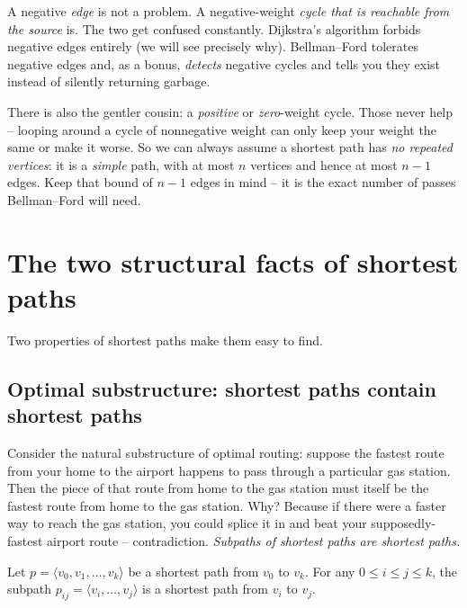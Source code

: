 \begin{trapbox}
A negative \emph{edge} is not a problem. A negative-weight \emph{cycle that is
reachable from the source} is. The two get confused constantly. Dijkstra's
algorithm forbids negative edges entirely (we will see precisely why). Bellman--Ford
tolerates negative edges and, as a bonus, \emph{detects} negative cycles and tells
you they exist instead of silently returning garbage.
\end{trapbox}

There is also the gentler cousin: a \emph{positive} or \emph{zero}-weight cycle.
Those never help -- looping around a cycle of nonnegative weight can only keep
your weight the same or make it worse. So we can always assume a shortest path
has \emph{no repeated vertices}: it is a \emph{simple} path, with at most $n$
vertices and hence at most $n - 1$ edges. Keep that bound of $n-1$ edges in
mind -- it is the exact number of passes Bellman--Ford will need.

\section{The two structural facts of shortest paths}

Two properties of shortest paths make them easy to find.

\subsection{Optimal substructure: shortest paths contain shortest paths}

\begin{intuitionbox}
Consider the natural substructure of optimal routing: suppose the fastest route
from your home to the airport happens to pass through a particular gas station. Then the
piece of that route from home to the gas station must itself be the fastest route
from home to the gas station. Why? Because if there were a faster way to reach the
gas station, you could splice it in and beat your supposedly-fastest airport
route -- contradiction. \emph{Subpaths of shortest paths are shortest paths.}
\end{intuitionbox}

\begin{lemma}\label{ch24:lemma-substructure}
Let $p = \langle v_0, v_1, \dots, v_k\rangle$ be a shortest path from $v_0$ to
$v_k$. For any $0 \le i \le j \le k$, the subpath
$p_{ij} = \langle v_i, \dots, v_j\rangle$ is a shortest path from $v_i$ to $v_j$.
\end{lemma}

